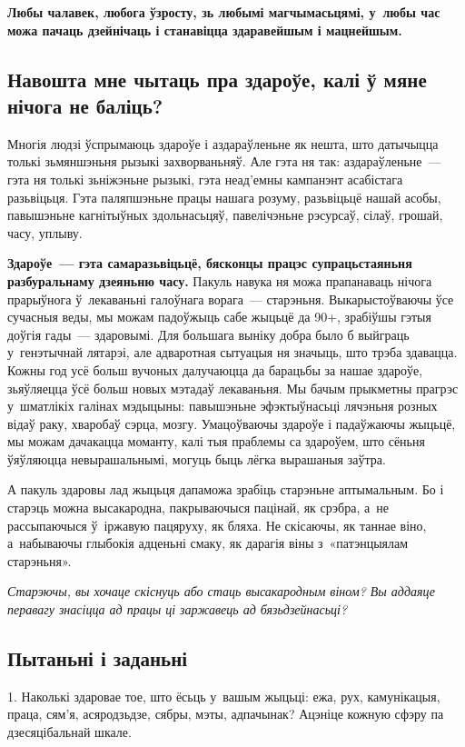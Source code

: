 \textbf{Любы чалавек, любога ўзросту, зь любымі магчымасьцямі, у~любы час можа пачаць дзейнічаць і станавіцца здаравейшым і мацнейшым.}

\subsection*{Навошта мне чытаць пра здароўе, калі ў мяне нічога не баліць?}

Многія людзі ўспрымаюць здароўе і аздараўленьне як нешта, што датычыцца толькі зьмяншэньня рызыкі захворваньняў. Але гэта ня так: аздараўленьне~--- гэта ня толькі зьніжэньне рызыкі, гэта неад'емны кампанэнт асабістага разьвіцьця. Гэта паляпшэньне працы нашага розуму, разьвіцьцё нашай асобы, павышэньне кагнітыўных здольнасьцяў, павелічэньне рэсурсаў, сілаў, грошай, часу, уплыву.

\textbf{Здароўе~--- гэта самаразьвіцьцё, бясконцы працэс супрацьстаяньня разбуральнаму дзеяньню часу.} Пакуль навука ня можа прапанаваць нічога прарыўнога ў~лекаваньні галоўнага ворага~--- старэньня. Выкарыстоўваючы ўсе сучасныя веды, мы можам падоўжыць сабе жыцьцё да 90+, зрабіўшы гэтыя доўгія гады~--- здаровымі. Для большага выніку добра было б выйграць у~генэтычнай лятарэі, але адваротная сытуацыя ня значыць, што трэба здавацца. Кожны год усё больш вучоных далучаюцца да барацьбы за нашае здароўе, зьяўляецца ўсё больш новых мэтадаў лекаваньня. Мы бачым прыкметны прагрэс у~шматлікіх галінах мэдыцыны: павышэньне эфэктыўнасьці лячэньня розных відаў раку, хваробаў сэрца, мозгу. Умацоўваючы здароўе і падаўжаючы жыцьцё, мы можам дачакацца моманту, калі тыя праблемы са здароўем, што сёньня ўяўляюцца невырашальнымі, могуць быць лёгка вырашаныя заўтра.

А пакуль здаровы лад жыцьця дапаможа зрабіць старэньне аптымальным. Бо і старэць можна высакародна, пакрываючыся пацінай, як срэбра, а~не рассыпаючыся ў~іржавую пацяруху, як бляха. Не скісаючы, як таннае віно, а~набываючы глыбокія адценьні смаку, як дарагія віны з~«патэнцыялам старэньня». 

\emph{Старэючы, вы хочаце скіснуць або стаць высакародным віном? Вы аддаяце перавагу знасіцца ад працы ці заржавець ад бязьдзейнасьці?}

\subsection*{Пытаньні і заданьні}

1. Наколькі здаровае тое, што ёсьць у~вашым жыцьці: ежа, рух, камунікацыя, праца, сям'я, асяродзьдзе, сябры, мэты, адпачынак? Ацэніце кожную сфэру па дзесяцібальнай шкале.


